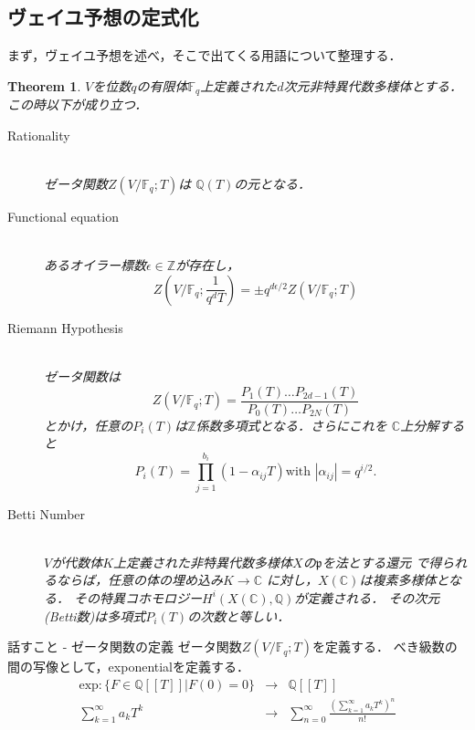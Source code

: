 \documentclass{ujarticle}
\newtheorem{thm}{Theorem}[section]
\begin{document}
\subsection{ヴェイユ予想の定式化}
\label{subs:ヴェイユ予想の定式化}
まず，ヴェイユ予想を述べ，そこで出てくる用語について整理する．
\begin{thm}
  $V$を位数$q$の有限体$\mathbb{F}_q$上定義された$d$次元非特異代数多様体とする．
  この時以下が成り立つ．
  \begin{description}
    \item[Rationality]  ~\\
    ゼータ関数$Z(V/\mathbb{F}_q;T)$は
    $\mathbb{Q}(T)$の元となる．
    \item[Functional equation] ~\\
    あるオイラー標数$ \epsilon \in \mathbb{Z}$が存在し，
    \begin{equation*}
      Z(V/\mathbb{F}_q;\frac{1}{q^dT})=\pm
      q^{d \epsilon/2}Z(V/\mathbb{F}_q;T)
    \end{equation*}
    \item[Riemann Hypothesis] ~\\
    ゼータ関数は
    \begin{equation*}
     Z(V/\mathbb{F}_q;T)=
     \frac{P_1(T)\dots P_{2d-1}(T)}{P_0(T)\dots P_{2N}(T)}
    \end{equation*}
    とかけ，任意の$P_i(T)$は$\mathbb{Z}$係数多項式となる．さらにこれを
    $ \mathbb{C} $上分解すると
    \begin{equation*}
     P_i(T)= \prod_{j=1}^{b_i}(1-\alpha_{ij}T) \mbox{with }
      |\alpha_{ij}|=q^{i/2}.
    \end{equation*}
    \item[Betti Number] ~\\
    $V$が代数体$K$上定義された非特異代数多様体$X$の$\mathfrak{p}$を法とする還元
    で得られるならば，任意の体の埋め込み$K \to \mathbb{C}$
    に対し，$X(\mathbb{C})$は複素多様体となる．
    その特異コホモロジー$H^i(X(\mathbb{C}),\mathbb{Q})$が定義される．
    その次元(Betti数)は多項式$P_i(T)$の次数と等しい．
  \end{description}
\end{thm}
話すこと
- ゼータ関数の定義
ゼータ関数$Z(V/\mathbb{F}_q;T)$を定義する．
べき級数の間の写像として，exponentialを定義する．
\begin{eqnarray*}
  \mathrm{exp}: \{F \in \mathbb{Q}[[T]] | F(0) = 0 \} & \to &
  \mathbb{Q}[[T]] \\
  \sum_{k=1}^{\infty}a_kT^k  & \to &
  \sum_{n=0}^{\infty}\frac{{(\sum_{k=1}^{\infty}a_kT^k) }^n}{n!}
\end{eqnarray*}
\end{document}
